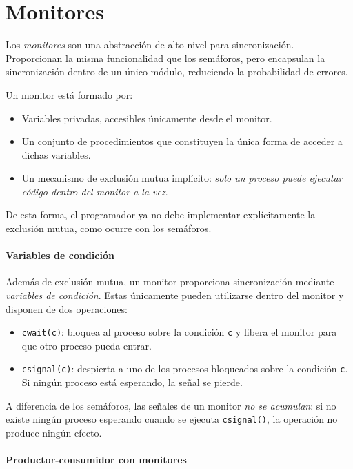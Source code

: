 \section{Monitores}

Los \textit{monitores} son una abstracción de alto nivel para sincronización. Proporcionan la misma funcionalidad que los semáforos, pero encapsulan la sincronización dentro de un único módulo, reduciendo la probabilidad de errores.

Un monitor está formado por:
\begin{itemize}
  \item Variables privadas, accesibles únicamente desde el monitor.
  \item Un conjunto de procedimientos que constituyen la única forma de acceder a dichas variables.
  \item Un mecanismo de exclusión mutua implícito: \textit{solo un proceso puede ejecutar código dentro del monitor a la vez}.
\end{itemize}

De esta forma, el programador ya no debe implementar explícitamente la exclusión mutua, como ocurre con los semáforos.

\paragraph{Variables de condición}

Además de exclusión mutua, un monitor proporciona sincronización mediante \textit{variables de condición}. Estas únicamente pueden utilizarse dentro del monitor y disponen de dos operaciones:

\begin{itemize}
  \item \texttt{cwait(c)}: bloquea al proceso sobre la condición \texttt{c} y libera el monitor para que otro proceso pueda entrar.
  \item \texttt{csignal(c)}: despierta a uno de los procesos bloqueados sobre la condición \texttt{c}. Si ningún proceso está esperando, la señal se pierde.
\end{itemize}

A diferencia de los semáforos, las señales de un monitor \textit{no se acumulan}: si no existe ningún proceso esperando cuando se ejecuta \texttt{csignal()}, la operación no produce ningún efecto.

\paragraph{Productor-consumidor con monitores}


